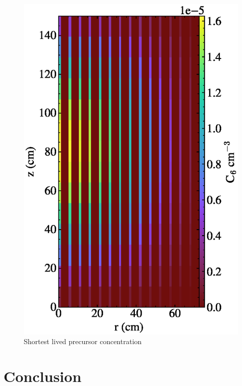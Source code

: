 \documentclass{article}
\let\Oldsection\section
\renewcommand{\section}{\FloatBarrier\Oldsection}
\begin{document}
\begin{figure}
  \centering
  \includegraphics{auto_diff_rho_pre6.eps}
  \caption{Shortest lived precursor concentration}
  \label{fig:pre6}
\end{figure}

\section{Conclusion}
\end{document}
